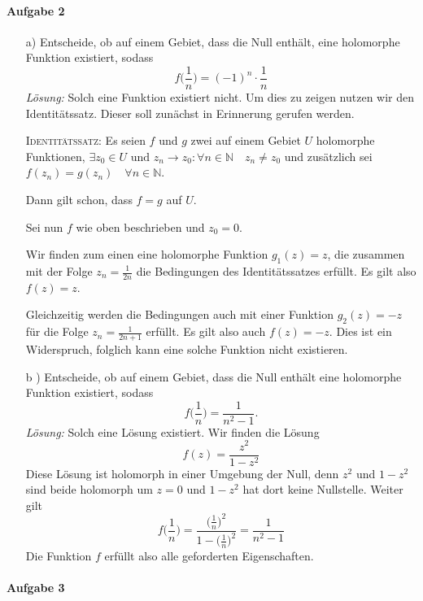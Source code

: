 \documentclass[11pt,a4paper]{article}
\theoremstyle{definition} \newtheorem{theo}{Theorem}[section]
\theoremstyle{definition} \newtheorem{defi}{Definition}[section]
\theoremstyle{definition} \newtheorem{cor}{Corollary}[section]
\theoremstyle{definition} \newtheorem{lemmas}{Lemma}[section]
\theoremstyle{definition} \newtheorem{assp}{Assumption}[section]
\theoremstyle{definition} \newtheorem{exam}{Example}[section]
\theoremstyle{definition} \newtheorem{sol}{Lösung}
\begin{document}
\paragraph{Aufgabe 2}
\begin{itemize}
	\item [a)] Entscheide, ob auf einem Gebiet, dass die Null enthält, eine holomorphe Funktion existiert, sodass 
	\[
	f\Big( \frac{1}{n} \Big) = (-1)^n \cdot \frac{1}{n}
	\]
	\textit{Lösung: } Solch eine Funktion existiert nicht. Um dies zu zeigen nutzen wir den Identitätssatz. Dieser soll zunächst in Erinnerung gerufen werden.
	\begin{description} \textsc{Identitätssatz:} Es seien $f$ und $g$ zwei auf einem Gebiet $U$ holomorphe Funktionen, $\exists z_0 \in U \textrm{ und } z_n  \rightarrow z_0: \forall n \in \mathbb{N} \quad z_n \ne z_0$ 
	und zusätzlich sei $f(z_n) = g(z_n) \quad \forall n \in \mathbb{N}$. 
	
	Dann gilt schon, dass $ f = g$ auf $U$.	
	\end{description}
	Sei nun $f$ wie oben beschrieben und $z_0 = 0$. 
	
	Wir finden zum einen eine holomorphe Funktion $g_1(z) = z$, die zusammen mit der Folge $z_n = \frac{1}{2n}$ die Bedingungen des Identitätssatzes erfüllt. Es gilt also $f(z) = z$.
	
	Gleichzeitig werden die Bedingungen auch mit einer Funktion $g_2(z) = -z$ für die Folge $z_n = \frac{1}{2n+1}$ erfüllt. Es gilt also auch $f(z) = -z$. Dies ist ein Widerspruch, folglich kann eine solche Funktion nicht existieren.
	
	\item[b )] Entscheide, ob auf einem Gebiet, dass die Null enthält eine holomorphe Funktion existiert, sodass 
	\[
	f\Big( \frac{1}{n} \Big) = \frac{1}{n^2 -1}.
	\]
	\textit{Lösung: } Solch eine Lösung existiert. Wir finden die Lösung
	\[
	f(z) = \frac{z^2}{1 -z^2}
	\]
	Diese Lösung ist holomorph in einer Umgebung der Null, denn $z^2$ und $1-z^2$ sind beide holomorph um $z = 0$ und $1 - z^2$ hat dort keine Nullstelle. Weiter gilt
	\[
	f \Big( \frac{1}{n} \Big) = \frac{\Big( \frac{1}{n} \Big)^2}{1 -\Big( \frac{1}{n} \Big)^2}
	 = \frac{1}{n^2 -1}
	\]
	Die Funktion $f$ erfüllt also alle geforderten Eigenschaften.
\end{itemize}


\paragraph{Aufgabe 3}
\end{document}
